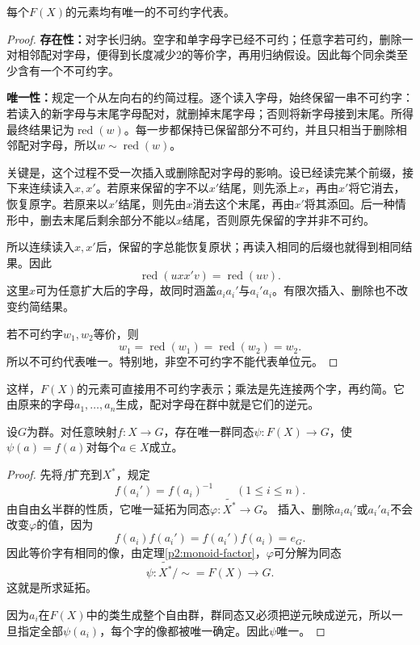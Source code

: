 \begin{proposition}
每个$F(X)$的元素均有唯一的不可约字代表。
\end{proposition}
\begin{proof}
\textbf{存在性：}对字长归纳。空字和单字母字已经不可约；任意字若可约，删除一对相邻配对字母，便得到长度减少2的等价字，再用归纳假设。因此每个同余类至少含有一个不可约字。

\textbf{唯一性：}规定一个从左向右的约简过程。逐个读入字母，始终保留一串不可约字：若读入的新字母与末尾字母配对，就删掉末尾字母；否则将新字母接到末尾。所得最终结果记为$\operatorname{red}(w)$。每一步都保持已保留部分不可约，并且只相当于删除相邻配对字母，所以$w\sim\operatorname{red}(w)$。

关键是，这个过程不受一次插入或删除配对字母的影响。设已经读完某个前缀，接下来连续读入$x,x'$。若原来保留的字不以$x'$结尾，则先添上$x$，再由$x'$将它消去，恢复原字。若原来以$x'$结尾，则先由$x$消去这个末尾，再由$x'$将其添回。后一种情形中，删去末尾后剩余部分不能以$x$结尾，否则原先保留的字并非不可约。

所以连续读入$x,x'$后，保留的字总能恢复原状；再读入相同的后缀也就得到相同结果。因此
\[
\operatorname{red}(uxx'v)=\operatorname{red}(uv).
\]
这里$x$可为任意扩大后的字母，故同时涵盖$a_ia_i'$与$a_i'a_i$。有限次插入、删除也不改变约简结果。

若不可约字$w_1,w_2$等价，则
\[
w_1=\operatorname{red}(w_1)=\operatorname{red}(w_2)=w_2.
\]
所以不可约代表唯一。特别地，非空不可约字不能代表单位元。
\end{proof}

这样，$F(X)$的元素可直接用不可约字表示；乘法是先连接两个字，再约简。它由原来的字母$a_1,\ldots,a_n$生成，配对字母在群中就是它们的逆元。

\begin{theorem}\label{p2:free-universal}
设$G$为群。对任意映射$f:X\to G$，存在唯一群同态$\psi:F(X)\to G$，使$\psi(a)=f(a)$对每个$a\in X$成立。
\end{theorem}
\begin{proof}
先将$f$扩充到$X^*$，规定
\[
f(a_i')=f(a_i)^{-1}\qquad(1\leq i\leq n).
\]
由自由幺半群的性质，它唯一延拓为同态$\varphi:\widetilde{X^*}\to G$。
插入、删除$a_ia_i'$或$a_i'a_i$不会改变$\varphi$的值，因为
\[
f(a_i)f(a_i')=f(a_i')f(a_i)=e_G.
\]
因此等价字有相同的像，由定理\ref{p2:monoid-factor}，$\varphi$可分解为同态
\[
\psi:\widetilde{X^*}/{\sim}=F(X)\longrightarrow G.
\]
这就是所求延拓。

因为$a_i$在$F(X)$中的类生成整个自由群，群同态又必须把逆元映成逆元，所以一旦指定全部$\psi(a_i)$，每个字的像都被唯一确定。因此$\psi$唯一。
\end{proof}


